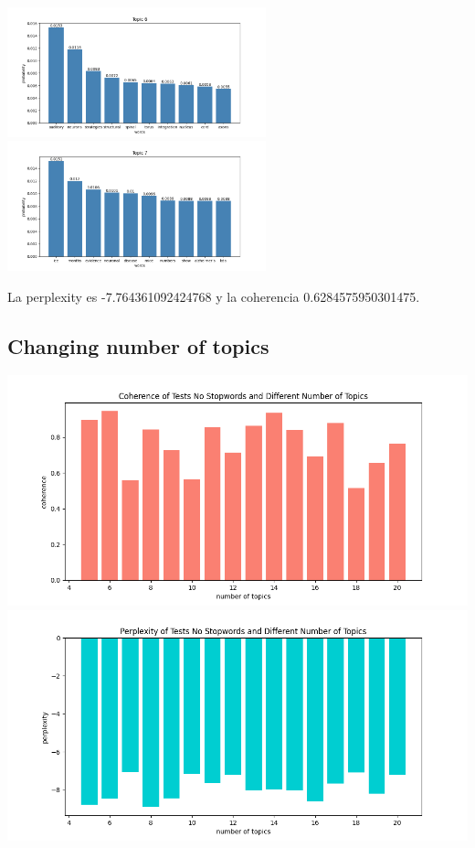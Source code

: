 \documentclass[10pt]{article} %
\begin{document}
\begin{center}
		\includegraphics[width=7.5cm]{images/plots/test_8_no_stopwords/topic_6.png}
		\includegraphics[width=7.5cm]{images/plots/test_8_no_stopwords/topic_7.png}
		
		
	\end{center}

	La perplexity es -7.764361092424768 y la coherencia  0.6284575950301475.

	
	\subsection{Changing number of topics}
	\begin{center}
		\includegraphics[scale=0.6]{images/coherence_no_stopwords_diff_n_topics}
		\includegraphics[scale=0.6]{images/perplexity_no_stopwords_diff_n_topics}
	\end{center}
\end{document}

